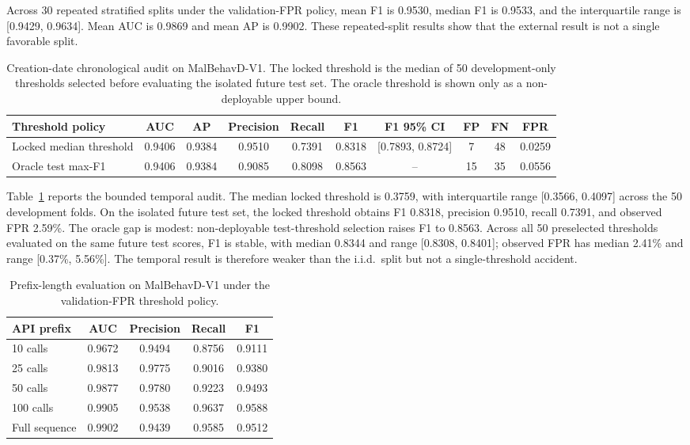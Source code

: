 \documentclass[10pt,journal,compsoc]{IEEEtran}
\begin{document}
Across 30 repeated stratified splits under the validation-FPR policy, mean F1 is 0.9530, median F1 is 0.9533, and the interquartile range is [0.9429, 0.9634]. Mean AUC is 0.9869 and mean AP is 0.9902. These repeated-split results show that the external result is not a single favorable split.

\begin{table}[t]
\centering
\caption{Creation-date chronological audit on MalBehavD-V1. The locked threshold is the median of 50 development-only thresholds selected before evaluating the isolated future test set. The oracle threshold is shown only as a non-deployable upper bound.}
\label{tab:malbehavd_temporal}
\scriptsize
\begin{tabular}{lccccccccc}
\toprule
\textbf{Threshold policy} & \textbf{AUC} & \textbf{AP} & \textbf{Precision} & \textbf{Recall} & \textbf{F1} & \textbf{F1 95\% CI} & \textbf{FP} & \textbf{FN} & \textbf{FPR} \\
\midrule
Locked median threshold & 0.9406 & 0.9384 & 0.9510 & 0.7391 & 0.8318 & [0.7893, 0.8724] & 7 & 48 & 0.0259 \\
Oracle test max-F1 & 0.9406 & 0.9384 & 0.9085 & 0.8098 & 0.8563 & -- & 15 & 35 & 0.0556 \\
\bottomrule
\end{tabular}
\end{table}

Table~\ref{tab:malbehavd_temporal} reports the bounded temporal audit. The median locked threshold is 0.3759, with interquartile range [0.3566, 0.4097] across the 50 development folds. On the isolated future test set, the locked threshold obtains F1 0.8318, precision 0.9510, recall 0.7391, and observed FPR 2.59\%. The oracle gap is modest: non-deployable test-threshold selection raises F1 to 0.8563. Across all 50 preselected thresholds evaluated on the same future test scores, F1 is stable, with median 0.8344 and range [0.8308, 0.8401]; observed FPR has median 2.41\% and range [0.37\%, 5.56\%]. The temporal result is therefore weaker than the i.i.d.\ split but not a single-threshold accident.

\begin{table}[t]
\centering
\caption{Prefix-length evaluation on MalBehavD-V1 under the validation-FPR threshold policy.}
\label{tab:malbehavd_prefix}
\begin{tabular}{lcccc}
\toprule
\textbf{API prefix} & \textbf{AUC} & \textbf{Precision} & \textbf{Recall} & \textbf{F1} \\
\midrule
10 calls & 0.9672 & 0.9494 & 0.8756 & 0.9111 \\
25 calls & 0.9813 & 0.9775 & 0.9016 & 0.9380 \\
50 calls & 0.9877 & 0.9780 & 0.9223 & 0.9493 \\
100 calls & 0.9905 & 0.9538 & 0.9637 & 0.9588 \\
Full sequence & 0.9902 & 0.9439 & 0.9585 & 0.9512 \\
\bottomrule
\end{tabular}
\end{table}
\end{document}
